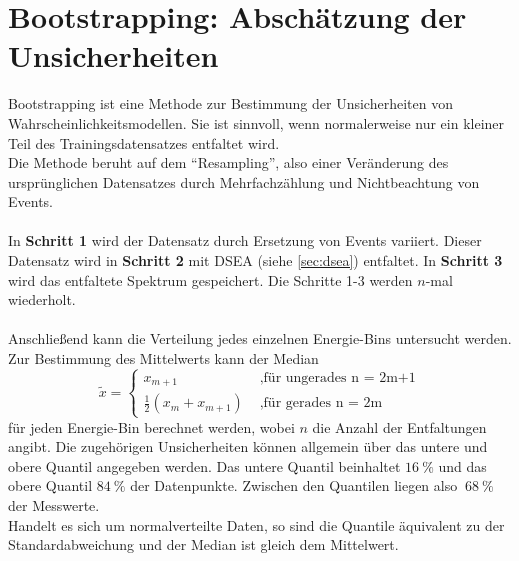 \section{Bootstrapping: Abschätzung der Unsicherheiten} \label{sec:bootstrap}
Bootstrapping\cite{lewis_poole_2004} ist eine Methode zur Bestimmung der Unsicherheiten von Wahrscheinlichkeitsmodellen.
Sie ist sinnvoll, wenn normalerweise nur ein kleiner Teil des Trainingsdatensatzes entfaltet wird.
\\
Die Methode beruht auf dem "`Resampling"', also einer Veränderung des ursprünglichen Datensatzes durch Mehrfachzählung und Nichtbeachtung von Events.
\\
\\
In \textbf{Schritt 1} wird der Datensatz durch Ersetzung von Events variiert.
Dieser Datensatz wird in \textbf{Schritt 2} mit DSEA (siehe \autoref{sec:dsea}) entfaltet.
In \textbf{Schritt 3} wird das entfaltete Spektrum gespeichert.
Die Schritte 1-3 werden $n$-mal wiederholt.
\\
\\
Anschließend kann die Verteilung jedes einzelnen Energie-Bins untersucht werden.
Zur Bestimmung des Mittelwerts kann der Median 
\begin{equation}
    \tilde {x} =
    \begin{cases}
        x_{m+1} & \text{ ,für ungerades n = 2m+1}\\
        \frac{1}{2} (x_{m}+x_{m+1}) & \text{ ,für gerades n = 2m}
    \end{cases}
\end{equation}
für jeden Energie-Bin berechnet werden, wobei $n$ die Anzahl der Entfaltungen angibt.
Die zugehörigen Unsicherheiten können allgemein über das untere und obere Quantil angegeben werden.
Das untere Quantil beinhaltet $\SI{16}{\percent}$ und das obere Quantil $\SI{84}{\percent}$ der Datenpunkte.
Zwischen den Quantilen liegen also $~\SI{68}{\percent}$ der Messwerte.
\\
Handelt es sich um normalverteilte Daten, so sind die Quantile äquivalent zu der Standardabweichung und der Median ist gleich dem Mittelwert.